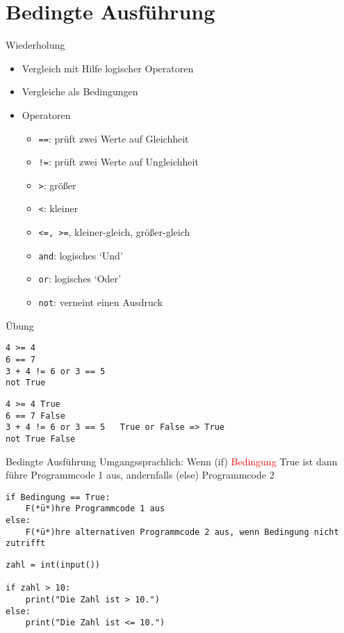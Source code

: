 \section{Bedingte Ausführung}

\begin{frame}[fragile]{Wiederholung}
	\begin{itemize}
		\item Vergleich mit Hilfe logischer Operatoren
		\item Vergleiche als Bedingungen
		\item Operatoren
	\begin{itemize}
		\item \texttt{==}: prüft zwei Werte auf Gleichheit
		\item \texttt{!=}: prüft zwei Werte auf Ungleichheit
		\item \texttt{>}: größer
		\item \texttt{<}: kleiner 
		\item \texttt{<=, >=}, kleiner-gleich, größer-gleich
		\item \texttt{and}: logisches `Und'
		\item \texttt{or}: logisches `Oder'
		\item \texttt{not}: verneint einen Ausdruck
	\end{itemize}
	\end{itemize}
\end{frame}
\begin{frame}[fragile]{Übung}
\begin{lstlisting} 
4 >= 4 
6 == 7
3 + 4 != 6 or 3 == 5
not True

\end{lstlisting}
\pause{}
\begin{lstlisting} 
4 >= 4 True
6 == 7 False
3 + 4 != 6 or 3 == 5   True or False => True
not True False

\end{lstlisting}
\end{frame}

\begin{frame}[fragile]{Bedingte Ausführung}
Umgangssprachlich: Wenn (if)  \textcolor{red}{Bedingung} True ist dann führe Programmcode 1 aus, andernfalls (else) Programmcode 2\\

\begin{lstlisting}
if Bedingung == True:
	F(*ü*)hre Programmcode 1 aus
else:
	F(*ü*)hre alternativen Programmcode 2 aus, wenn Bedingung nicht zutrifft
\end{lstlisting}

\begin{lstlisting}
zahl = int(input())

if zahl > 10:
	print("Die Zahl ist > 10.")
else:
	print("Die Zahl ist <= 10.")
\end{lstlisting}
\end{frame}

